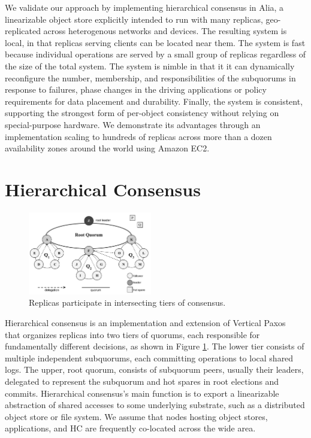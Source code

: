 \documentclass[11pt,conference]{IEEEtran}
\newcommand{\hc}{hierarchical consensus\xspace}
\begin{document}
We validate our approach by implementing \hc in Alia, a linearizable object store
explicitly intended to run with many replicas, geo-replicated across heterogenous
networks and devices.
The resulting system is local, in that replicas serving clients can be located near them.
The system is fast because individual operations are served by a small group of replicas
regardless of the size of the total system.
The system is nimble in that it it can dynamically reconfigure the number, membership,
and responsibilities of the subquorums in response to failures, phase changes in the
driving applications or policy requirements for data placement and durability.
Finally, the system is consistent, supporting the strongest form of per-object
consistency without relying on special-purpose hardware.
We demonstrate its advantages through an implementation scaling to hundreds of replicas
across more than a dozen availability zones around the world using Amazon EC2.



\section{Hierarchical Consensus}

\begin{figure}[t]
    \centering
    \includegraphics[width=0.48\textwidth]{figures/election3}
    \caption{Replicas participate in intersecting tiers of consensus.}
    \label{fig:system}
\end{figure}

Hierarchical consensus is an implementation and extension of Vertical
Paxos~\cite{vertical_paxos} that organizes replicas into two tiers of
quorums, each responsible for fundamentally different decisions, as shown
in Figure \ref{fig:system}.
The lower tier consists of multiple independent subquorums, each committing
operations to local shared logs.
The upper, root quorum, consists of subquorum peers, usually their leaders,
delegated to represent the subquorum and hot spares in root elections and
commits.
Hierarchical consensus's main function is to export a linearizable abstraction
of shared accesses to some underlying substrate, such as a distributed
object store or file system.
We assume that nodes hosting object stores, applications, and HC are
frequently co-located across the wide area.
\end{document}
